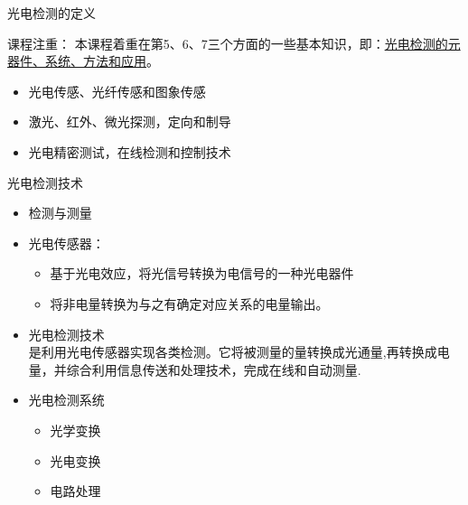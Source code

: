 \documentclass[10pt]{beamer}
\begin{document}
\begin{frame}{光电检测的定义}
	
	\begin{alertblock}{课程注重：}
	本课程着重在第5、6、7三个方面的一些基本知识，即：\underline{光电检测的元器件、系统、方法和应用}。
	\end{alertblock}
	\begin{itemize}
    
        \item \alert{光电传感、光纤传感和图象传感}
        \item \alert{激光、红外、微光探测，定向和制导}
        \item \alert{光电精密测试，在线检测和控制技术}
        
    \end{itemize}
	
\end{frame}
\begin{frame}{光电检测技术}
    \begin{itemize}
        \item 检测与测量
        \item 光电传感器：\\
                \begin{itemize}
            \item<2-| alert@2>[+] 基于光电效应，将光信号转换为电信号的一种光电器件
            \item<2-| alert@3>[+] 将非电量转换为与之有确定对应关系的电量输出。
                \end{itemize}
        \item 光电检测技术\\
        是利用光电传感器实现各类检测。它将被测量的量转换成光通量,再转换成电量，并综合利用信息传送和处理技术，完成在线和自动测量.
                
        \item 光电检测系统\\
                \begin{itemize}
            \item<2-| alert@4>[+] 光学变换
            \item<2-| alert@5>[+] 光电变换
            \item<2-| alert@6>[+] 电路处理
                \end{itemize}

    \end{itemize}

\end{frame}
\end{document}
